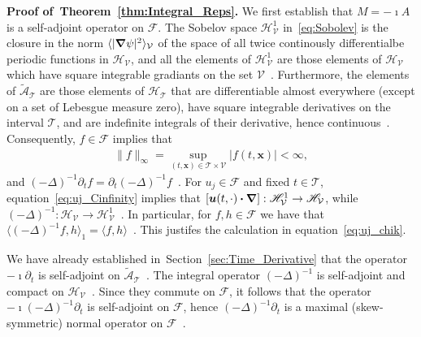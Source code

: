 \documentclass[leqno,onefignum,onetabnum]{siamltex1213}
\newcommand{\secref}[1]{Section~\ref{#1}}
\newcommand{\thmref}[1]{Theorem~\ref{#1}}
\newcommand{\Tc}{\mathcal{T}}
\newcommand{\Vc}{\mathcal{V}}
\newcommand{\Hs}{\mathscr{H}}
\newcommand{\As}{\mathscr{A}}
\newcommand{\Fs}{\mathscr{F}}
\newcommand\bnabla{\mbox{\boldmath${\nabla}$}}
\providecommand\bcdot{\boldsymbol{\cdot}}
\newcommand{\vecx}{\boldsymbol{x}}
\newcommand{\vecu}{\boldsymbol{u}}
\begin{document}
%
\textbf{Proof of~\thmref{thm:Integral_Reps}.}\hspace{1ex}
%
We first establish that $M=-\imath A$ is a self-adjoint operator on
$\Fs$. The Sobelov space $\Hs^1_{\Vc}$ in~\eqref{eq:Sobolev} is the
closure in the norm $\langle|\bnabla\psi|^2\rangle_{\Vc}$ of the space of all twice
continously differentialbe periodic functions in $\Hs_{\Vc}$, and all
the elements of $\Hs^1_{\Vc}$ are those elements of $\Hs_{\Vc}$ which
have square integrable gradiants on the set
$\Vc$~\cite{Bhattacharya:AAP:1999:951}. Furthermore, the elements of
$\tilde{\As}_{\Tc}$ are those elements of $\Hs_{\Tc}$ that are
differentiable almost everywhere (except on a set of Lebesgue measure
zero), have square integrable derivatives on the interval
$\Tc$, and are indefinite integrals of their
derivative, hence continuous~\cite{Royden:1988:RA}. Consequently,
$f\in\Fs$ implies that~\cite{Stone:64,Royden:1988:RA} 
%
\begin{align}\label{eq:uj_Cinfinity}
  \|f\|_\infty=\sup_{(t,\vecx)\in\Tc\times\Vc}|f(t,\vecx)|<\infty,
\end{align}
%
and
$(-\Delta)^{-1}\partial_{t}f=\partial_{t}(-\Delta)^{-1}f$~\cite{Folland:99:RealAnalysis,Stakgold:BVP:2000}. For
$u_j\in\Fs$ and fixed $t\in\Tc$, equation~\eqref{eq:uj_Cinfinity} implies that
$[\vecu(t,\cdot)\bcdot\bnabla]:\Hs^1_{\Vc}\to\Hs_{\Vc}$, while
$(-\Delta)^{-1}:\Hs_{\Vc}\to\Hs^1_{\Vc}$~\cite{Bhattacharya:AAP:1999:951}. In
particular, for $f,h\in\Fs$ we have that
$\langle(-\Delta)^{-1}f,h\rangle_1=\langle f,h\rangle$~\cite{Bhattacharya:AAP:1999:951}. This 
justifes the calculation in equation~\eqref{eq:uj_chik}.  





We have already established in~\secref{sec:Time_Derivative} that the
operator $-\imath\partial_t$ is self-adjoint on
$\tilde{\As}_{\Tc}$~\cite{Stone:64}. The integral operator $(-\Delta)^{-1}$
is self-adjoint and compact on
$\Hs_{\Vc}$~\cite{Stakgold:BVP:2000}. Since they commute on $\Fs$, it  
follows that the operator $-\imath(-\Delta)^{-1}\partial_{t}$ is self-adjoint on $\Fs$,
hence $(-\Delta)^{-1}\partial_{t}$ is a maximal (skew-symmetric) normal operator
on $\Fs$~\cite{Stone:64}.
\end{document}

